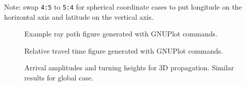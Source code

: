\documentclass[10pt]{article}
\begin{document}
Note: swap \verb=4:5= to \verb=5:4= for spherical coordinate cases to put longitude on the horizontal axis and latitude on the vertical axis.

\begin{figure}[h]
\centering
{}
\caption[Ray Path Figure]{Example ray path figure generated with GNUPlot commands.}
\end{figure}

\begin{figure}
\centering
{}
\caption[Travel Time Figure]{Relative travel time figure generated with GNUPlot commands.}
\end{figure}

\begin{figure}
\centering
{}
\caption[Travel Time Figure]{Arrival amplitudes and turning heights for 3D propagation.  Similar results for global case.}
\end{figure}
\end{document}
